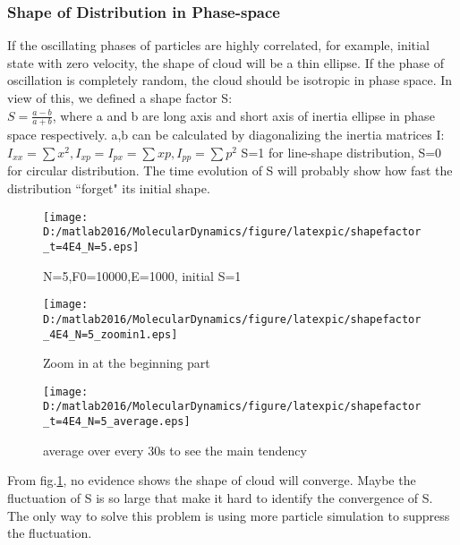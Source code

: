 \documentclass[aps,pre,twocolumn
,groupedaddress]{revtex4-1}
\begin{document}
\subsubsection{Shape of Distribution in Phase-space}
If the oscillating phases of particles are highly correlated, for example, initial state with zero velocity, the shape of cloud will be a thin ellipse. If the phase of oscillation is completely random, the cloud should be isotropic in phase space. In view of this, we defined a shape factor S:
\\$S=\frac{a-b}{a+b}$, where a and b are long axis and short axis of inertia ellipse in phase space respectively. a,b can be calculated by diagonalizing the inertia matrices I: $I_{xx}=\sum{x^2}, I_{xp}=I_{px}=\sum{xp},I_{pp}=\sum{p^2}$
S=1 for line-shape distribution, S=0 for circular distribution.
The time evolution of S will probably show how fast the distribution ``forget" its initial shape.  


\begin{figure}[hbtp]

\centering
\texttt{[image: D:/matlab2016/MolecularDynamics/figure/latexpic/shapefactor\_t=4E4\_N=5.eps]}
\caption{N=5,F0=10000,E=1000, initial S=1}
\end{figure}
\begin{figure}[hbtp]
\centering
\texttt{[image: D:/matlab2016/MolecularDynamics/figure/latexpic/shapefactor\_4E4\_N=5\_zoomin1.eps]} 
\caption{Zoom in at the beginning part}
\end{figure}
\begin{figure}[hbtp]
\centering
\texttt{[image: D:/matlab2016/MolecularDynamics/figure/latexpic/shapefactor\_t=4E4\_N=5\_average.eps]}
\caption{average over every 30s to see the main tendency}
\label{fig:relaxationPS1}
\end{figure}


From fig.\ref{fig:relaxationPS1}, no evidence shows the shape of cloud will converge. Maybe the fluctuation of S is so large that make it hard to identify the convergence of S. The only way to solve this problem is using more particle simulation to suppress the fluctuation.
\end{document}
